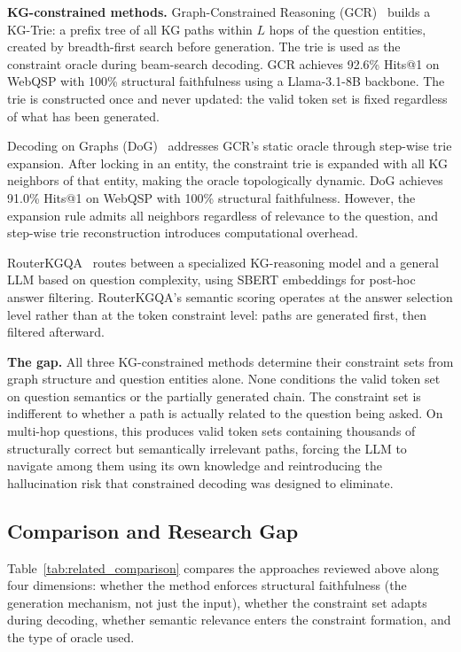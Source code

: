 \textbf{KG-constrained methods.} Graph-Constrained Reasoning
(GCR)~\citep{luo2025-graph-constrained-reasoning} builds a KG-Trie: a prefix tree of
all KG paths within $L$ hops of the question entities, created by breadth-first search
before generation. The trie is used as the constraint oracle during beam-search
decoding. GCR achieves 92.6\% Hits@1 on WebQSP with 100\% structural faithfulness
using a Llama-3.1-8B backbone. The trie is constructed once and never updated: the
valid token set is fixed regardless of what has been generated.

Decoding on Graphs (DoG)~\citep{li2024-decoding-on-graphs} addresses GCR's static
oracle through step-wise trie expansion. After locking in an entity, the constraint
trie is expanded with all KG neighbors of that entity, making the oracle topologically
dynamic. DoG achieves 91.0\% Hits@1 on WebQSP with 100\% structural faithfulness.
However, the expansion rule admits all neighbors regardless of relevance to the question,
and step-wise trie reconstruction introduces computational overhead.

RouterKGQA~\citep{yuan2026routerkgqa} routes between a specialized KG-reasoning model
and a general LLM based on question complexity, using SBERT embeddings for post-hoc
answer filtering. RouterKGQA's semantic scoring operates at the answer selection level
rather than at the token constraint level: paths are generated first, then filtered
afterward.

\textbf{The gap.} All three KG-constrained methods determine their constraint sets
from graph structure and question entities alone. None conditions the valid token set on
question semantics or the partially generated chain. The constraint set is indifferent
to whether a path is actually related to the question being asked. On multi-hop questions,
this produces valid token sets containing thousands of structurally correct but
semantically irrelevant paths, forcing the LLM to navigate among them using its own
knowledge and reintroducing the hallucination risk that constrained decoding was designed
to eliminate.

\subsection{Comparison and Research Gap}
\label{sec:related:gap}

Table~\ref{tab:related_comparison} compares the approaches reviewed above along four
dimensions: whether the method enforces structural faithfulness (the generation
mechanism, not just the input), whether the constraint set adapts during decoding,
whether semantic relevance enters the constraint formation, and the type of oracle used.

